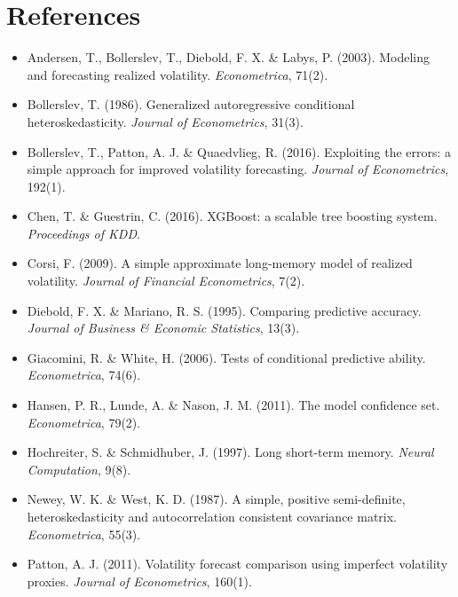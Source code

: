 \documentclass[11pt,a4paper]{article}
\begin{document}
\section*{References}
\small
\begin{itemize}\setlength{\itemsep}{0pt}
\item Andersen, T., Bollerslev, T., Diebold, F. X. \& Labys, P. (2003). Modeling and forecasting realized volatility. \emph{Econometrica}, 71(2).
\item Bollerslev, T. (1986). Generalized autoregressive conditional heteroskedasticity. \emph{Journal of Econometrics}, 31(3).
\item Bollerslev, T., Patton, A. J. \& Quaedvlieg, R. (2016). Exploiting the errors: a simple approach for improved volatility forecasting. \emph{Journal of Econometrics}, 192(1).
\item Chen, T. \& Guestrin, C. (2016). XGBoost: a scalable tree boosting system. \emph{Proceedings of KDD}.
\item Corsi, F. (2009). A simple approximate long-memory model of realized volatility. \emph{Journal of Financial Econometrics}, 7(2).
\item Diebold, F. X. \& Mariano, R. S. (1995). Comparing predictive accuracy. \emph{Journal of Business \& Economic Statistics}, 13(3).
\item Giacomini, R. \& White, H. (2006). Tests of conditional predictive ability. \emph{Econometrica}, 74(6).
\item Hansen, P. R., Lunde, A. \& Nason, J. M. (2011). The model confidence set. \emph{Econometrica}, 79(2).
\item Hochreiter, S. \& Schmidhuber, J. (1997). Long short-term memory. \emph{Neural Computation}, 9(8).
\item Newey, W. K. \& West, K. D. (1987). A simple, positive semi-definite, heteroskedasticity and autocorrelation consistent covariance matrix. \emph{Econometrica}, 55(3).
\item Patton, A. J. (2011). Volatility forecast comparison using imperfect volatility proxies. \emph{Journal of Econometrics}, 160(1).
\end{itemize}
\end{document}
